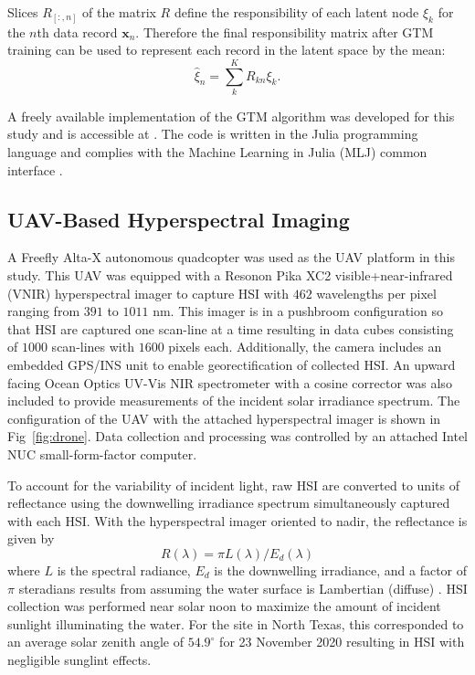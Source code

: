 \documentclass[remotesensing,article,submit,pdftex,moreauthors]{Definitions/mdpi}
\begin{document}
Slices $R_{[:,n]}$ of the matrix $R$ define the responsibility of each latent node $\xi_k$ for the $n$th data record $\mathbf{x}_n$. Therefore the final responsibility matrix after GTM training can be used to represent each record in the latent space by the mean:
\begin{equation}
    \hat{\xi}_n = \sum_{k}^K R_{kn}\xi_k.
\end{equation}

A freely available implementation of the GTM algorithm was developed for this study and is accessible at \cite{gtm-code}. The code is written in the Julia programming language and complies with the Machine Learning in Julia (MLJ) common interface \cite{bezanson2012julia,blaom2020mlj}.

\subsection{UAV-Based Hyperspectral Imaging}

A Freefly Alta-X autonomous quadcopter was used as the UAV platform in this study. This UAV was equipped with a Resonon Pika XC2 visible+near-infrared (VNIR) hyperspectral imager to capture HSI with $462$ wavelengths per pixel ranging from $391$ to $1011$ nm. This imager is in a pushbroom configuration so that HSI are captured one scan-line at a time resulting in data cubes consisting of $1000$ scan-lines with $1600$ pixels each. Additionally, the camera includes an embedded GPS/INS unit to enable georectification of collected HSI. An upward facing Ocean Optics UV-Vis NIR spectrometer with a cosine corrector was also included to provide measurements of the incident solar irradiance spectrum. The configuration of the UAV with the attached hyperspectral imager is shown in Fig~\ref{fig:drone}. Data collection and processing was controlled by an attached Intel NUC small-form-factor computer.

To account for the variability of incident light, raw HSI are converted to units of reflectance using the downwelling irradiance spectrum simultaneously captured with each HSI. With the hyperspectral imager oriented to nadir, the reflectance is given by
\begin{equation}\label{eq:reflectance}
    R(\lambda) = \pi L(\lambda)/E_d(\lambda)
\end{equation}
where $L$ is the spectral radiance, $E_d$ is the downwelling irradiance, and a factor of $\pi$ steradians results from assuming the water surface is Lambertian (diffuse) \cite{ruddick2019review}. HSI collection was performed near solar noon to maximize the amount of incident sunlight illuminating the water. For the site in North Texas, this corresponded to an average solar zenith angle of $54.9^\circ$ for 23 November 2020 resulting in HSI with negligible sunglint effects. 
\end{document}
